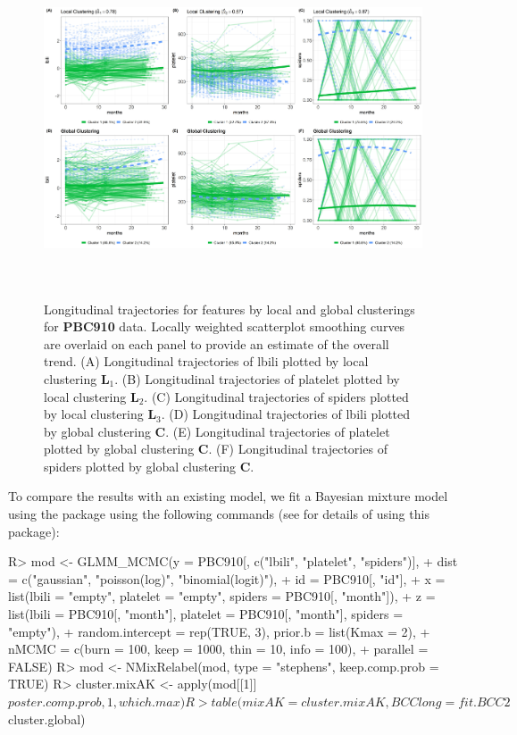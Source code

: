 \begin{figure}[h]
\centering
\includegraphics[width=\textwidth,height=10cm]{./Figures/trajplot_PBC910.JPEG}
\caption{\label{fig:traj} Longitudinal trajectories for features by local and global clusterings for \textbf{PBC910} data. Locally weighted scatterplot smoothing curves are overlaid on each panel to provide an estimate of the overall trend.  (A) Longitudinal trajectories of lbili plotted by local clustering $\boldsymbol{L}_1$. (B) Longitudinal trajectories of platelet plotted by local clustering $\boldsymbol{L}_2$. (C) Longitudinal trajectories of spiders plotted by local clustering $\boldsymbol{L}_3$. (D) Longitudinal trajectories of lbili plotted by global clustering $\boldsymbol{C}$. (E)  Longitudinal trajectories of platelet plotted by global clustering $\boldsymbol{C}$. (F)  Longitudinal trajectories of spiders plotted by global clustering $\boldsymbol{C}$.}
\end{figure}

To compare the results with an existing model, we fit a Bayesian mixture model using the  package using the following commands (see \citep{Komarek2014} for details of using this package): 

\begin{example}
R> mod <- GLMM_MCMC(y = PBC910[, c("lbili", "platelet", "spiders")],
+        dist = c("gaussian", "poisson(log)", "binomial(logit)"),
+        id = PBC910[, "id"], 
+        x = list(lbili = "empty", platelet = "empty", spiders = PBC910[, "month"]), 
+        z = list(lbili = PBC910[, "month"], platelet = PBC910[, "month"], spiders = "empty"),
+        random.intercept = rep(TRUE, 3), prior.b = list(Kmax = 2),
+        nMCMC = c(burn = 100, keep = 1000, thin = 10, info = 100),
+        parallel = FALSE)
R> mod <- NMixRelabel(mod, type = "stephens", keep.comp.prob = TRUE)
R> cluster.mixAK <- apply(mod[[1]]$poster.comp.prob, 1, which.max)
R> table(mixAK = cluster.mixAK, BCClong = fit.BCC2$cluster.global)
\end{example} 

